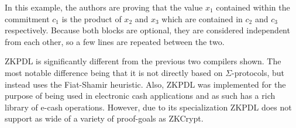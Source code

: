 \documentclass{sig-alternate}
\begin{document}
		In this example, the authors are proving that the value $x_{1}$ contained within
		the commitment $c_{1}$ is the product of $x_{2}$ and $x_{3}$ which are contained
		in $c_{2}$ and $c_{3}$ respectively. Because both blocks are optional, they are
		considered independent from each other, so a few lines are repeated between the two.
		
		ZKPDL is significantly different from the previous two compilers shown. The most notable
		difference being that it is not directly based on $\Sigma$-protocols, but instead uses
		the Fiat-Shamir heuristic. Also, ZKPDL was implemented for the purpose of being
		used in electronic cash applications and as such has a rich library of e-cash operations.
		However, due to its specialization ZKPDL does not support as wide of a variety of proof-goals
		as ZKCrypt.
		
\end{document}
